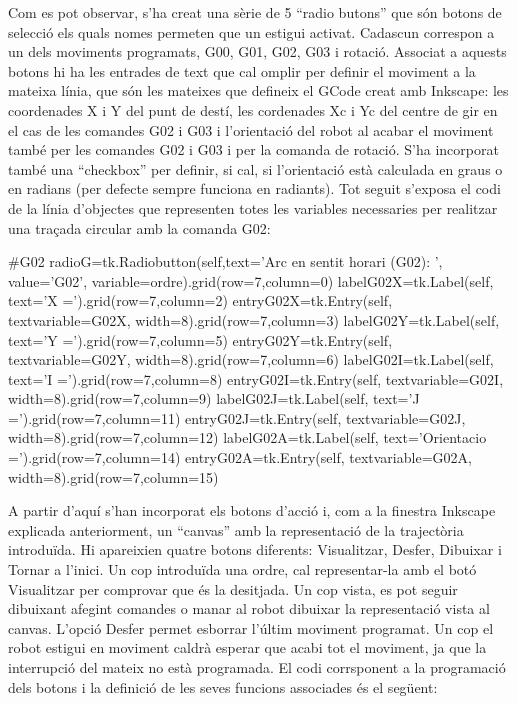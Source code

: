 Com es pot observar, s’ha creat una sèrie de 5  “radio butons” que són botons de selecció els quals nomes permeten que un estigui activat. Cadascun correspon a un dels moviments programats, G00, G01, G02, G03 i rotació. Associat a aquests botons hi ha les entrades de text que cal omplir per definir el moviment a la mateixa línia, que són les mateixes que defineix el GCode creat amb Inkscape: les coordenades X i Y del punt de destí, les cordenades Xc i Yc del centre de gir en el cas de les comandes G02 i G03 i l’orientació del robot al acabar el moviment també per les comandes G02 i G03 i per la comanda de rotació. S’ha incorporat també una “checkbox” per definir, si cal, si l’orientació està calculada en graus o en radians (per defecte sempre funciona en radiants). Tot seguit s'exposa el codi de la línia d'objectes que representen totes les variables necessaries per realitzar una traçada circular amb la comanda G02:

\begin{python}
		#G02
		radioG=tk.Radiobutton(self,text='Arc en sentit horari (G02): ', value='G02', variable=ordre).grid(row=7,column=0)
		labelG02X=tk.Label(self, text='X =').grid(row=7,column=2)
		entryG02X=tk.Entry(self, textvariable=G02X, width=8).grid(row=7,column=3)
		labelG02Y=tk.Label(self, text='Y =').grid(row=7,column=5)
		entryG02Y=tk.Entry(self, textvariable=G02Y, width=8).grid(row=7,column=6)
		labelG02I=tk.Label(self, text='I =').grid(row=7,column=8)
		entryG02I=tk.Entry(self, textvariable=G02I, width=8).grid(row=7,column=9)
		labelG02J=tk.Label(self, text='J =').grid(row=7,column=11)
		entryG02J=tk.Entry(self, textvariable=G02J, width=8).grid(row=7,column=12)
		labelG02A=tk.Label(self, text='Orientacio =').grid(row=7,column=14)
		entryG02A=tk.Entry(self, textvariable=G02A, width=8).grid(row=7,column=15)
\end{python}

A partir d’aquí s’han incorporat els botons d’acció i, com a la finestra Inkscape explicada anteriorment, un “canvas” amb la representació de la trajectòria introduïda. Hi apareixien quatre botons diferents: Visualitzar, Desfer, Dibuixar i Tornar a l’inici. Un cop introduïda una ordre, cal representar-la amb el botó Visualitzar per comprovar que és la desitjada. Un cop vista, es pot seguir dibuixant afegint comandes o manar al robot dibuixar la representació vista al canvas. L’opció Desfer permet esborrar l’últim moviment programat. Un cop el robot estigui en moviment caldrà esperar que acabi tot el moviment, ja que la interrupció del mateix no està programada. El codi corrsponent a la programació dels botons i la definició de les seves funcions associades és el següent:

